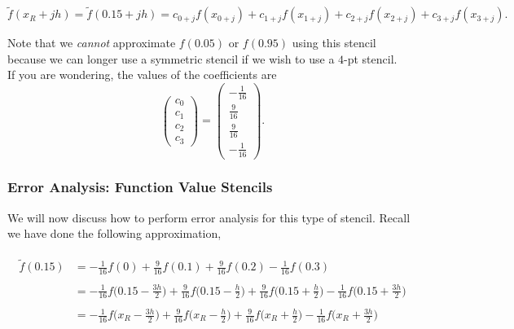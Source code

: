 \documentclass[paper=a4, fontsize=11pt]{scrartcl} %
\numberwithin{equation}{section} %
\numberwithin{figure}{section} %
\numberwithin{table}{section} %
\begin{document}
$$\tilde{f}(x_R+jh) = \tilde{f}(0.15+jh) = c_{0+j} f(x_{0+j}) + c_{1+j} f(x_{1+j}) + c_{2+j} f(x_{2+j}) + c_{3+j} f(x_{3+j}).$$

Note that we \emph{cannot} approximate $f(0.05)$ or $f(0.95)$ using this stencil because we can longer use a symmetric stencil if we wish to use a $4$-pt stencil.\\

If you are wondering, the values of the coefficients are\\

$$\left( \begin{array}{c}
c_{0} \\
c_{1} \\
c_2 \\
c_3 
\end{array} \right) = \left( \begin{array}{c}
-\frac{1}{16} \\
\frac{9}{16}  \\
\frac{9}{16}  \\
-\frac{1}{16} 
\end{array} \right).$$ $ $\\ 
%

\subsubsection{Error Analysis: Function Value Stencils}

$ $\\

We will now discuss how to perform error analysis for this type of stencil. Recall we have done the following approximation,

\begin{align}
\nonumber
\begin{split}
\tilde{f}(0.15) &= -\frac{1}{16} f(0) + \frac{9}{16} f(0.1) + \frac{9}{16} f(0.2) - \frac{1}{16} f(0.3) \\ \\
&= -\frac{1}{16}  f\Big(0.15-\frac{3h}{2}\Big) + \frac{9}{16} f\Big(0.15-\frac{h}{2}\Big) + \frac{9}{16} f\Big(0.15+\frac{h}{2}\Big) - \frac{1}{16} f\Big(0.15+\frac{3h}{2}\Big) \\ \\
&= -\frac{1}{16}  f\Big(x_R-\frac{3h}{2}\Big) + \frac{9}{16} f\Big(x_R-\frac{h}{2}\Big) + \frac{9}{16} f\Big(x_R+\frac{h}{2}\Big) - \frac{1}{16} f\Big(x_R+\frac{3h}{2}\Big) \\
\end{split}
\end{align}\\
\end{document}

